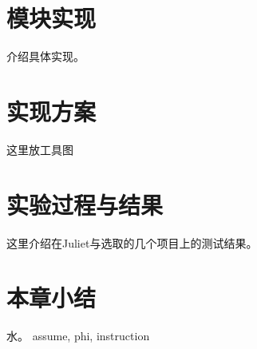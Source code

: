 \section{模块实现}

介绍具体实现。

\section{实现方案} 

这里放工具图

\section{实验过程与结果}

这里介绍在Juliet与选取的几个项目上的测试结果。

\section{本章小结}

水。
assume, phi, instruction



















































